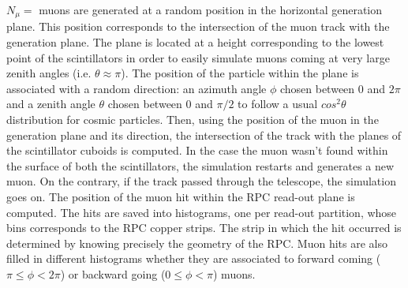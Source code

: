 	$N_{\mu}=$  muons are generated at a random position in the horizontal generation plane. This position corresponds to the intersection of the muon track with the generation plane. The plane is located at a height corresponding to the lowest point of the scintillators in order to easily simulate muons coming at very large zenith angles (i.e. $\theta\approx\pi$). The position of the particle within the plane is associated with a random direction: an azimuth angle $\phi$ chosen between 0 and $2\pi$ and a zenith angle $\theta$ chosen between 0 and $\pi/2$ to follow a usual $cos^2\theta$ distribution for cosmic particles. Then, using the position of the muon in the generation plane and its direction, the intersection of the track with the planes of the scintillator cuboids is computed. In the case the muon wasn't found within the surface of both the scintillators, the simulation restarts and generates a new muon. On the contrary, if the track passed through the telescope, the simulation goes on. The position of the muon hit within the RPC read-out plane is computed. The hits are saved into histograms, one per read-out partition, whose bins corresponds to the RPC copper strips. The strip in which the hit occurred is determined by knowing precisely the geometry of the RPC. Muon hits are also filled in different histograms whether they are associated to forward coming ($\pi\leq\phi<2\pi$) or backward going ($0\leq\phi<\pi$) muons.

